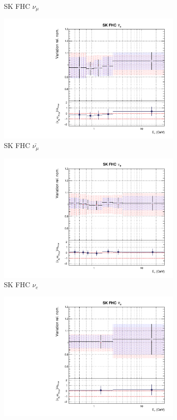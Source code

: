 \begin{figure}[t]
\begin{subfigure}{0.42\textwidth}
  \caption{SK FHC $\nu_{\mu}$}
\end{subfigure}
\begin{subfigure}{0.42\textwidth}
  \centering
  \includegraphics[width=0.75\linewidth]{figs/rhcmpdat248flux_9}
  \caption{SK FHC $\bar{\nu_{\mu}}$}
\end{subfigure}
\begin{subfigure}{0.42\textwidth}
  \centering
  \includegraphics[width=0.75\linewidth]{figs/rhcmpdat248flux_10}
  \caption{SK FHC $\nu_e$}
\end{subfigure}
\begin{subfigure}{0.42\textwidth}
  \centering
  \includegraphics[width=0.75\linewidth]{figs/rhcmpdat248flux_11}

\end{subfigure}
\end{figure}
